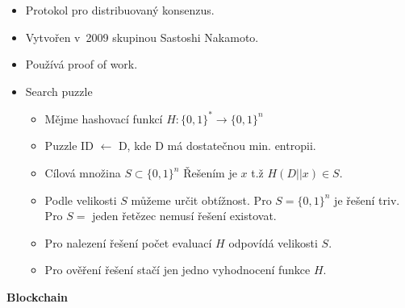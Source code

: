 \documentclass[a4paper,12pt,titlepage]{article}
\def\nadpis#1{{\bigskip\large\bf\noindent{#1}}\par\bigskip}
\def\podnadpis#1{{\bigskip\bf\noindent#1\medskip\par}}
\begin{document}
\nadpis{Bitcoin}
\begin{itemize}
\item{Protokol pro distribuovaný konsenzus.}
\item{Vytvořen v~2009 skupinou Sastoshi Nakamoto.}
\item{Používá proof of work.}
\item{Search puzzle}
	\begin{itemize}
		\item{Mějme hashovací funkcí \(H : \{0, 1\}^{*} \rightarrow \{0, 1\}^n\)}
		\item{Puzzle ID \(\leftarrow\) D, kde D má dostatečnou min. entropii.}
		\item{Cílová množina \(S \subset \{0, 1\}^n\)
			Řešením je \(x\) t.ž \(H(D || x) \in S\).}
		\item{Podle velikosti \(S\) můžeme určit obtížnost. 
			Pro \(S = \{0, 1\}^n\) je řešení triv.
			Pro \(S = \) jeden řetězec nemusí řešení existovat.} 
		\item{Pro nalezení řešení počet evaluací \(H\) odpovídá velikosti \(S\).}
		\item{Pro ověření řešení stačí jen jedno vyhodnocení funkce \(H\).}
	\end{itemize}
\end{itemize}
\podnadpis{Blockchain}
\end{document}
